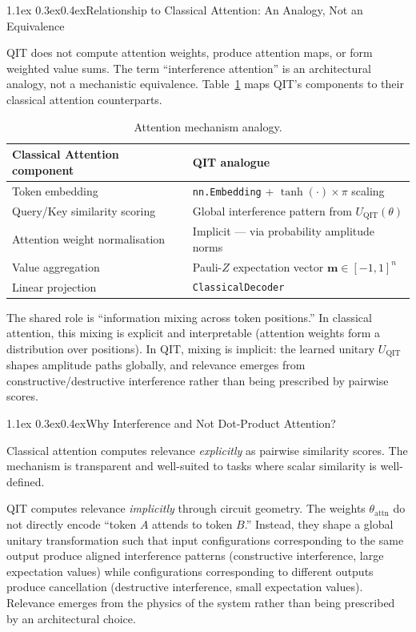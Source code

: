 \documentclass[11pt,a4paper]{article}
\makeatletter
\renewcommand\subsection{\@startsection{subsection}{2}{\z@}%
  {1.1ex \@plus 0.3ex}{0.4ex}{\normalfont\normalsize\bfseries}}
\newcommand{\UQIT}{U_{\!\text{QIT}}}
\makeatother
\begin{document}
\subsection{Relationship to Classical Attention: An Analogy, Not an Equivalence}

QIT does not compute attention weights, produce attention maps, or form weighted value
sums. The term ``interference attention'' is an architectural analogy, not a mechanistic
equivalence. Table~\ref{tab:analogy} maps QIT's components to their classical attention
counterparts.

\begin{table}[h]
\centering
\caption{Attention mechanism analogy.}
\label{tab:analogy}
\begin{tabular}{@{}ll@{}}
\toprule
Classical Attention component & QIT analogue \\
\midrule
Token embedding                & \texttt{nn.Embedding} + $\tanh(\cdot)\times\pi$ scaling \\
Query/Key similarity scoring   & Global interference pattern from $\UQIT(\theta)$ \\
Attention weight normalisation & Implicit — via probability amplitude norms \\
Value aggregation              & Pauli-$Z$ expectation vector $\mathbf{m} \in [-1,1]^n$ \\
Linear projection              & \texttt{ClassicalDecoder} \\
\bottomrule
\end{tabular}
\end{table}

The shared role is ``information mixing across token positions.'' In classical attention,
this mixing is explicit and interpretable (attention weights form a distribution over
positions). In QIT, mixing is implicit: the learned unitary $\UQIT$ shapes amplitude
paths globally, and relevance emerges from constructive/destructive interference rather
than being prescribed by pairwise scores.

\subsection{Why Interference and Not Dot-Product Attention?}

Classical attention computes relevance \emph{explicitly} as pairwise similarity scores.
The mechanism is transparent and well-suited to tasks where scalar similarity is
well-defined.

QIT computes relevance \emph{implicitly} through circuit geometry. The weights
$\theta_\text{attn}$ do not directly encode ``token $A$ attends to token $B$.''
Instead, they shape a global unitary transformation such that input configurations
corresponding to the same output produce aligned interference patterns (constructive
interference, large expectation values) while configurations corresponding to different
outputs produce cancellation (destructive interference, small expectation values).
Relevance emerges from the physics of the system rather than being prescribed by an
architectural choice.
\end{document}
